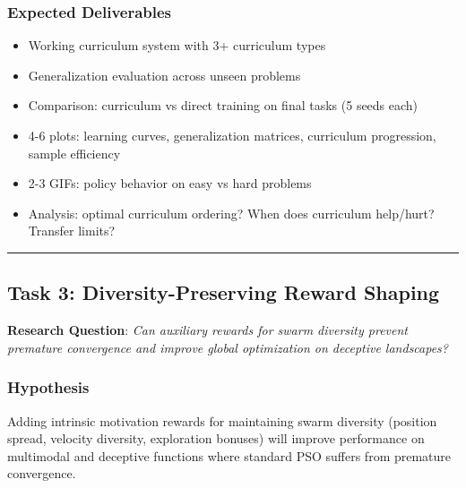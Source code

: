 \documentclass[11pt,a4paper]{scrartcl}
\newcommand{\sectiondivider}{%
  \vspace{0.2em}%
  \noindent\textcolor{rulecolor}{\rule{0.3\textwidth}{0.4pt}}%
  \vspace{0.3em}%
}
\begin{document}
\subsubsection*{Expected Deliverables}
\begin{itemize}
    \item Working curriculum system with 3+ curriculum types
    \item Generalization evaluation across unseen problems
    \item Comparison: curriculum vs direct training on final tasks (5 seeds each)
    \item 4-6 plots: learning curves, generalization matrices, curriculum progression, sample efficiency
    \item 2-3 GIFs: policy behavior on easy vs hard problems
    \item Analysis: optimal curriculum ordering? When does curriculum help/hurt? Transfer limits?
\end{itemize}

\sectiondivider

\subsection*{Task 3: Diversity-Preserving Reward Shaping}

\textbf{Research Question}: \textit{Can auxiliary rewards for swarm diversity prevent premature convergence and improve global optimization on deceptive landscapes?}

\subsubsection*{Hypothesis}
Adding intrinsic motivation rewards for maintaining swarm diversity (position spread, velocity diversity, exploration bonuses) will improve performance on multimodal and deceptive functions where standard PSO suffers from premature convergence.
\end{document}
